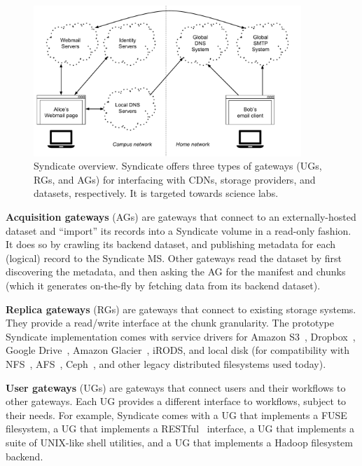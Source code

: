 \begin{figure}[h]
   \centering
   \includegraphics[width=0.9\textwidth,page=20]{figures/dissertation-figures}
   \caption{Syndicate overview.  Syndicate offers three types of gateways (UGs,
   RGs, and AGs) for interfacing with CDNs, storage providers, and datasets,
   respectively.  It is targeted towards science labs.}
   \label{fig:chap3-syndicate-overview}
\end{figure}

\textbf{Acquisition gateways} (AGs) are gateways that connect to an externally-hosted
dataset and ``import'' its records into a Syndicate volume in a read-only
fashion.  It does so by crawling its backend dataset, and publishing metadata
for each (logical) record to the Syndicate MS.  Other gateways read the dataset
by first discovering the metadata, and then asking the AG for the manifest and
chunks (which it generates on-the-fly by fetching data from its backend
dataset).

\textbf{Replica gateways} (RGs) are gateways that connect to existing storage
systems.  They provide a read/write interface at the chunk granularity.
The prototype Syndicate implementation comes with service drivers for Amazon S3~\cite{s3}, Dropbox~\cite{dropbox},
Google Drive~\cite{gdrive}, Amazon Glacier~\cite{amazon-glacier}, iRODS,
and local disk (for compatibility with NFS~\cite{nfs}, AFS~\cite{afs},
Ceph~\cite{ceph}, and other legacy distributed filesystems used today).

\textbf{User gateways} (UGs) are gateways that connect users and their workflows
to other gateways.  Each UG provides a different interface to workflows, subject
to their needs.  For example, Syndicate comes with a UG that implements a
FUSE~\cite{fuse} filesystem, a UG that implements a RESTful~\cite{rest}
interface, a UG that implements a suite of UNIX-like shell utilities, and a UG
that implements a Hadoop filesystem~\cite{hadoop} backend.

